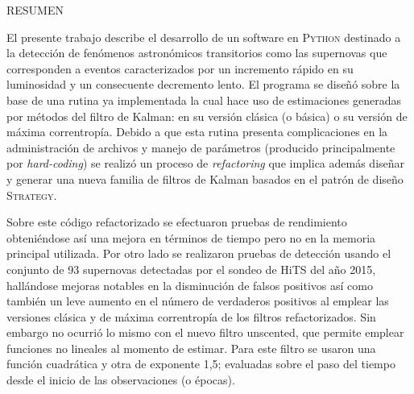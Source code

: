 


\begin{preface}
\begin{center}
\uppercase{Resumen}
\end{center}
El presente trabajo describe el desarrollo de un software en \textsc{Python} destinado a la detecci\'on de fen\'omenos astron\'omicos transitorios como las supernovas que corresponden a eventos caracterizados por un incremento r\'apido en su luminosidad y un consecuente decremento lento. El programa se dise\~n\'o sobre la base de una rutina ya implementada la cual hace uso de estimaciones generadas por m\'etodos del filtro de Kalman: en su versi\'on cl\'asica (o b\'asica) o su versi\'on de m\'axima correntrop\'ia. Debido a que esta rutina presenta complicaciones en la administraci\'on de archivos y manejo de par\'ametros (producido principalmente por \textit{hard-coding}) se realiz\'o un proceso de \textit{refactoring} que implica adem\'as dise\~nar y generar una nueva familia de filtros de Kalman basados en el patr\'on de dise\~no \textsc{Strategy}.
\bigskip

Sobre este c\'odigo refactorizado se efectuaron pruebas de rendimiento obteni\'endose as\'i una mejora en t\'erminos de tiempo pero no en la memoria principal utilizada. Por otro lado se realizaron pruebas de detecci\'on usando el conjunto de 93 supernovas detectadas por el sondeo de HiTS del a\~no 2015, hall\'andose mejoras notables en la disminuci\'on de falsos positivos as\'i como tambi\'en un leve aumento en el n\'umero de verdaderos positivos al emplear las versiones cl\'asica y de m\'axima correntrop\'ia de los filtros refactorizados. Sin embargo no ocurri\'o lo mismo con el nuevo filtro unscented, que permite emplear funciones no lineales al momento de estimar. Para este filtro se usaron una funci\'on cuadr\'atica y otra de exponente 1,5; evaluadas sobre el paso del tiempo desde el inicio de las observaciones (o \'epocas).   
\bigskip


\end{preface}
